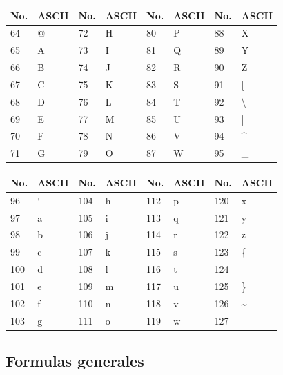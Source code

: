 \documentclass[10pt,landscape,twocolumn,letterpaper,twosided]{article}
\begin{document}
		
		\begin{table}[H]
			\begin{tabular}{|l|l|l|l|l|l|l|l|}
				\hline \textbf{No.} & \textbf{ASCII} & \textbf{No.} & \textbf{ASCII}  &
					\textbf{No.} & \textbf{ASCII} & \textbf{No.} & \textbf{ASCII} \\ \hline
				64 & @ & 72 & H & 80 & P & 88 & X \\ \hline
				65 & A & 73 & I & 81 & Q & 89 & Y \\ \hline
				66 & B & 74 & J & 82 & R & 90 & Z \\ \hline
				67 & C & 75 & K & 83 & S & 91 & [ \\ \hline
				68 & D & 76 & L & 84 & T & 92 & \textbackslash \\ \hline
				69 & E & 77 & M & 85 & U & 93 & ] \\ \hline
				70 & F & 78 & N & 86 & V & 94 & \textasciicircum \\ \hline
				71 & G & 79 & O & 87 & W & 95 & \_ \\ \hline
			\end{tabular}
		\end{table}
		
		\begin{table}[H]
			\begin{tabular}{|l|l|l|l|l|l|l|l|}
				\hline \textbf{No.} & \textbf{ASCII} & \textbf{No.} & \textbf{ASCII}  &
					\textbf{No.} & \textbf{ASCII} & \textbf{No.} & \textbf{ASCII} \\ \hline
				96 & ` & 104 & h & 112 & p & 120 & x \\ \hline
				97 & a & 105 & i & 113 & q & 121 & y \\ \hline
				98 & b & 106 & j & 114 & r & 122 & z \\ \hline
				99 & c & 107 & k & 115 & s & 123 & \{ \\ \hline
				100 & d & 108 & l & 116 & t & 124 & \textbar \\ \hline
				101 & e & 109 & m & 117 & u & 125 & \} \\ \hline
				102 & f & 110 & n & 118 & v & 126 & \textasciitilde \\ \hline
				103 & g &  111 & o & 119 & w & 127 &  \\ \hline
			\end{tabular}
		\end{table}
		


\subsection{Formulas generales}
\end{document}
